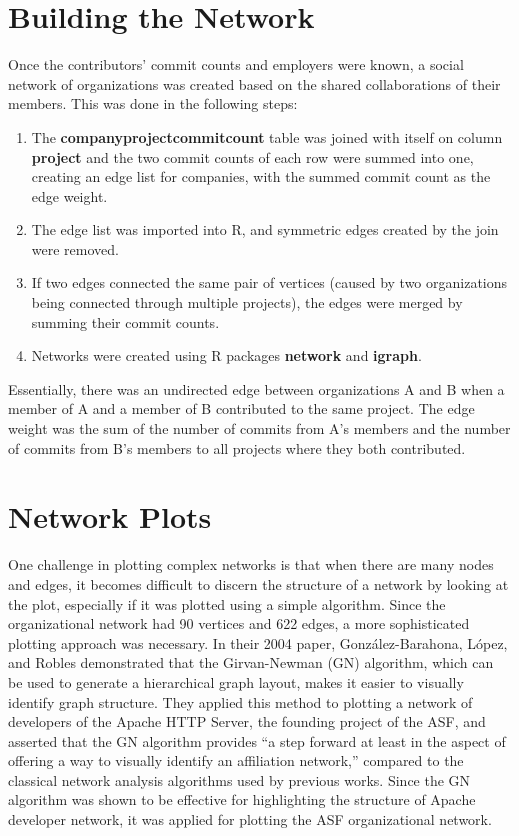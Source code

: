 \section{Building the Network}
Once the contributors' commit counts and employers were known, a social network of organizations was created based on the shared collaborations of their members. This was done in the following steps:
\begin{enumerate}
	\item The \textbf{companyprojectcommitcount} table was joined with itself on column \textbf{project} and the two commit counts of each row were summed into one, creating an edge list for companies, with the summed commit count as the edge weight.
	\item The edge list was imported into R, and symmetric edges created by the join were removed.
	\item If two edges connected the same pair of vertices (caused by two organizations being connected through multiple projects), the edges were merged by summing their commit counts. 
	\item Networks were created using R packages \textbf{network} and \textbf{igraph}.
\end{enumerate}
Essentially, there was an undirected edge between organizations A and B when a member of A and a member of B contributed to the same project. The edge weight was the sum of the number of commits from A's members and the number of commits from B's members to all projects where they both contributed.

\section{Network Plots}
One challenge in plotting complex networks is that when there are many nodes and edges, it becomes difficult to discern the structure of a network by looking at the plot, especially if it was plotted using a simple algorithm. Since the organizational network had 90 vertices and 622 edges, a more sophisticated plotting approach was necessary. In their 2004 paper\cite{gonzalez2004community}, Gonz{\'a}lez-Barahona, L{\'o}pez, and Robles demonstrated that the Girvan-Newman (GN) algorithm, which can be used to generate a hierarchical graph layout, makes it easier to visually identify graph structure. They applied this method to plotting a network of developers of the Apache HTTP Server, the founding project of the ASF, and asserted that the GN algorithm provides ``a step forward at least in the aspect of offering a way to visually identify an affiliation network,'' compared to the classical network analysis algorithms used by previous works. Since the GN algorithm was shown to be effective for highlighting the structure of Apache developer network, it was applied for plotting the ASF organizational network.

